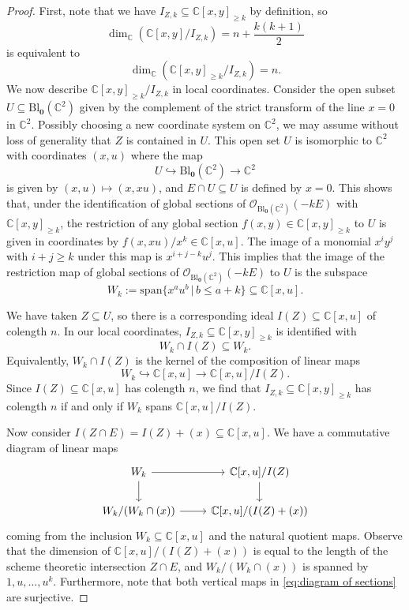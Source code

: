 \documentclass[12pt]{amsart}
\newcommand{\C}{\mathbb{C}}
\newcommand{\CO}{\mathcal{O}}
\newcommand{\Bl}{\mathrm{Bl}}
\numberwithin{equation}{section}
\theoremstyle{definition}
\begin{document}
\begin{proof}
    First, note that we have $I_{Z,k}\subseteq \C[x,y]_{\geq k}$ by definition, so 
    \[ \dim_{\C}\left(\C[x,y]/I_{Z,k}\right) = n + \frac{k(k+1)}2 \]
    is equivalent to 
    \[ \dim_{\C}\left(\C[x,y]_{\geq k}/I_{Z,k}\right) = n. \]
    We now describe $\C[x,y]_{\geq k}/I_{Z,k}$ in local coordinates. Consider the open subset $U\subseteq \Bl_{\mathbf{0}}(\C^2)$ given by the complement of the strict transform of the line $x=0$ in $\C^2$. Possibly choosing a new coordinate system on $\C^2$, we may assume without loss of generality that $Z$ is contained in $U$. This open set $U$ is isomorphic to $\C^2$ with coordinates $(x,u)$ where the map 
    \[ U\hookrightarrow \Bl_{\mathbf{0}}(\C^2) \to \C^2\]
    is given by $(x,u)\mapsto (x,xu)$, and $E\cap U \subseteq U$ is defined by $x=0$. This shows that, under the identification of global sections of $\CO_{\Bl_{\mathbf{0}}(\C^2)}(-kE)$ with $\C[x,y]_{\geq k}$, the restriction of any global section $f(x,y)\in \C[x,y]_{\geq k}$ to $U$ is given in coordinates by $f(x,xu)/x^k\in \C[x,u]$. The image of a monomial $x^i y^j$ with $i+j\geq k$ under this map is $x^{i+j-k}u^j$. This implies that the image of the restriction map of global sections of $\CO_{\Bl_{\mathbf{0}}(\C^2)}(-kE)$ to $U$ is the subspace
    \[ W_k := \mathrm{span}\{ x^a u^b \, | \, b\leq a+k \}\subseteq \C[x,u]. \]
    
    We have taken $Z\subseteq U$, so there is a corresponding ideal $I(Z)\subseteq \C[x,u]$ of colength $n$. In our local coordinates, $I_{Z,k}\subseteq \C[x,y]_{\geq k}$ is identified with 
    \[ W_k \cap I(Z) \subseteq W_k. \]
    Equivalently, $W_k \cap I(Z)$ is the kernel of the composition of linear maps
    \[ W_k \hookrightarrow \C[x,u] \to \C[x,u]/I(Z). \]
    Since $I(Z)\subseteq \C[x,u]$ has colength $n$, we find that $I_{Z,k}\subseteq \C[x,y]_{\geq k}$ has colength $n$ if and only if $W_k$ spans $\C[x,u]/I(Z)$. 

    Now consider $I(Z\cap E) = I(Z) +(x) \subseteq \C[x,u]$. We have a commutative diagram of linear maps
    \begin{equation}\label{eq:diagram of sections} \begin{tikzcd} 
    W_k \arrow[r] \arrow[d] & \C[x,u]/I(Z) \arrow[d] \\
    W_k/(W_k\cap (x)) \arrow[r] & \C[x,u]/(I(Z)+(x))
    \end{tikzcd}\end{equation}
    coming from the inclusion $W_k\subseteq \C[x,u]$ and the natural quotient maps. Observe that the dimension of $\C[x,u]/(I(Z)+(x))$ is equal to the length of the scheme theoretic intersection $Z\cap E$, and $W_k/(W_k\cap (x))$ is spanned by $1,u,\dots,u^k$. Furthermore, note that both vertical maps in \eqref{eq:diagram of sections} are surjective.


\end{proof}
\end{document}
